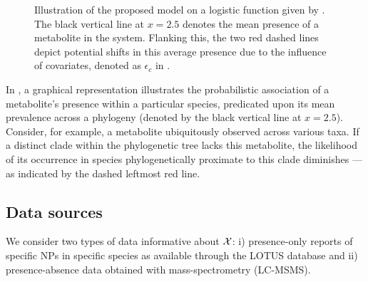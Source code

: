 \documentclass[
11pt, %
oneside, %
english, %
singlespacing, %
headsepline, %
chapterinoneline, %
]{MastersDoctoralThesis} %
\def\X{{\cal X}}
\begin{document}
\begin{figure}[h]
	\centering
	\caption{Illustration of the proposed model on a logistic function given by . The black vertical line at $x=2.5$ denotes the mean presence of a metabolite in the system. Flanking this, the two red dashed lines depict potential shifts in this average presence due to the influence of covariates, denoted as $\epsilon_c$ in .}
	\label{fig: example sigmoid function}
\end{figure}

In , a graphical representation illustrates the probabilistic association of a metabolite's presence within a particular species, predicated upon its mean prevalence across a phylogeny (denoted by the black vertical line at $x=2.5$). Consider, for example, a metabolite ubiquitously observed across various taxa. If a distinct clade within the phylogenetic tree lacks this metabolite, the likelihood of its occurrence in species phylogenetically proximate to this clade diminishes — as indicated by the dashed leftmost red line.

	\subsection{Data sources}\label{subsec: data sources}
	We consider two types of data informative about $\X$: i) presence-only reports of specific NPs in specific species as available through the LOTUS database and ii) presence-absence data obtained with mass-spectrometry (LC-MSMS).
	
\end{document}
